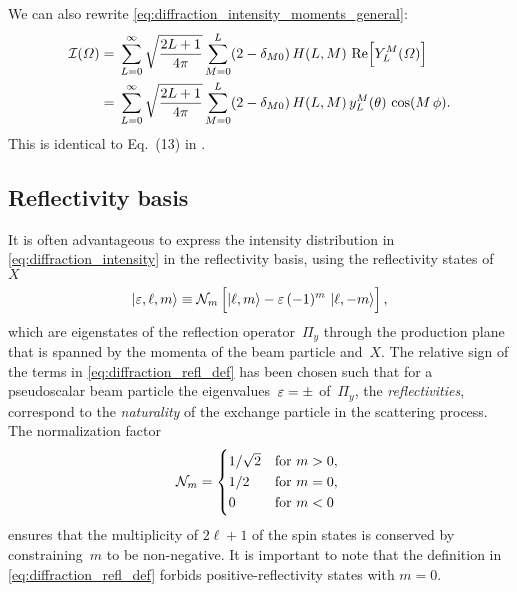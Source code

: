 We can also rewrite \cref{eq:diffraction_intensity_moments_general}:
\begin{align}
  \intensity(\Omega)
  ={}& \sum_{L = 0}^\infty \sqrt{\frac{2 L + 1}{4 \pi}} \sum_{M = 0}^{L} (2 - \delta_{M 0})\, H(L, M)\, \Re{Y_L^M(\Omega)} \nonumber
  \\
  \label{eq:diffraction_intensity_moments_real}
  ={}& \sum_{L = 0}^\infty \sqrt{\frac{2 L + 1}{4 \pi}} \sum_{M = 0}^{L} (2 - \delta_{M 0})\, H(L, M)\, y_L^M(\theta)\, \cos(M\, \phi).
\end{align}
This is identical to Eq.~(13) in .


\subsection{Reflectivity basis}%
\label{sec:diffraction:reflectivity}

It is often advantageous to express the intensity distribution in
\cref{eq:diffraction_intensity} in the reflectivity basis, \ie using
the reflectivity states of~$X$
\begin{equation}
  \label{eq:diffraction_refl_def}
  \ket{\refl, \ell, m}
  \equiv \mathcal{N}_m \sBrk[2]{\ket{\ell, m} - \refl\, (-1)^m\, \ket{\ell, {-m}}},
\end{equation}
which are eigenstates of the reflection operator~$\Pi_y$ through the
production plane that is spanned by the momenta of the beam particle
and~$X$.  The relative sign of the terms in
\cref{eq:diffraction_refl_def} has been chosen such that for a
pseudoscalar beam particle the eigenvalues~$\varepsilon = \pm$ of~$\Pi_y$,
\ie the \emph{reflectivities}, correspond to the \emph{naturality} of
the exchange particle in the scattering process.  The normalization
factor
\begin{equation}
  \label{eq:refl_norm}
  \mathcal{N}_m
  = \begin{cases*}
      1 / \sqrt{2} & for $m > 0$, \\
      1 / 2        & for $m = 0$, \\
      0            & for $m < 0$
    \end{cases*}
\end{equation}
ensures that the multiplicity of $2 \ell + 1$ of the spin states is
conserved by constraining~$m$ to be non-negative.  It is important to
note that the definition in \cref{eq:diffraction_refl_def} forbids
positive-reflectivity states with $m = 0$.

